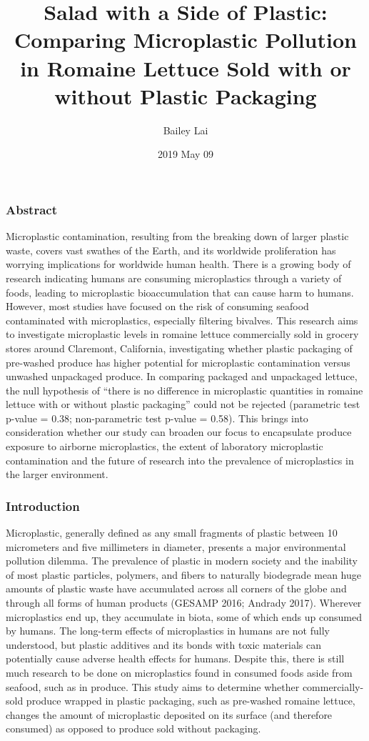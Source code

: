 \documentclass[]{article}
\title{Salad with a Side of Plastic: Comparing Microplastic Pollution in
Romaine Lettuce Sold with or without Plastic Packaging}
\author{Bailey Lai}
\date{2019 May 09}
\begin{document}
\maketitle

\hypertarget{abstract}{%
\subsubsection{Abstract}\label{abstract}}

Microplastic contamination, resulting from the breaking down of larger
plastic waste, covers vast swathes of the Earth, and its worldwide
proliferation has worrying implications for worldwide human health.
There is a growing body of research indicating humans are consuming
microplastics through a variety of foods, leading to microplastic
bioaccumulation that can cause harm to humans. However, most studies
have focused on the risk of consuming seafood contaminated with
microplastics, especially filtering bivalves. This research aims to
investigate microplastic levels in romaine lettuce commercially sold in
grocery stores around Claremont, California, investigating whether
plastic packaging of pre-washed produce has higher potential for
microplastic contamination versus unwashed unpackaged produce. In
comparing packaged and unpackaged lettuce, the null hypothesis of
``there is no difference in microplastic quantities in romaine lettuce
with or without plastic packaging'' could not be rejected (parametric
test p-value = 0.38; non-parametric test p-value = 0.58). This brings
into consideration whether our study can broaden our focus to
encapsulate produce exposure to airborne microplastics, the extent of
laboratory microplastic contamination and the future of research into
the prevalence of microplastics in the larger environment.

\hypertarget{introduction}{%
\subsubsection{Introduction}\label{introduction}}

Microplastic, generally defined as any small fragments of plastic
between 10 micrometers and five millimeters in diameter, presents a
major environmental pollution dilemma. The prevalence of plastic in
modern society and the inability of most plastic particles, polymers,
and fibers to naturally biodegrade mean huge amounts of plastic waste
have accumulated across all corners of the globe and through all forms
of human products (GESAMP 2016; Andrady 2017). Wherever microplastics
end up, they accumulate in biota, some of which ends up consumed by
humans. The long-term effects of microplastics in humans are not fully
understood, but plastic additives and its bonds with toxic materials can
potentially cause adverse health effects for humans. Despite this, there
is still much research to be done on microplastics found in consumed
foods aside from seafood, such as in produce. This study aims to
determine whether commercially-sold produce wrapped in plastic
packaging, such as pre-washed romaine lettuce, changes the amount of
microplastic deposited on its surface (and therefore consumed) as
opposed to produce sold without packaging.
\end{document}

